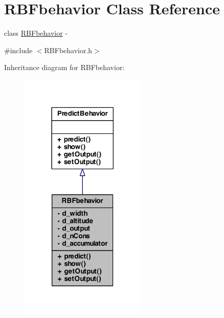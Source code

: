 \hypertarget{class_r_b_fbehavior}{
\section{RBFbehavior Class Reference}
\label{class_r_b_fbehavior}
}


class \hyperlink{class_r_b_fbehavior}{RBFbehavior} -\/  




{\ttfamily \#include $<$RBFbehavior.h$>$}



Inheritance diagram for RBFbehavior:
\nopagebreak
\begin{figure}[H]
\begin{center}
\leavevmode
\includegraphics[width=170pt]{class_r_b_fbehavior__inherit__graph}
\end{center}
\end{figure}


